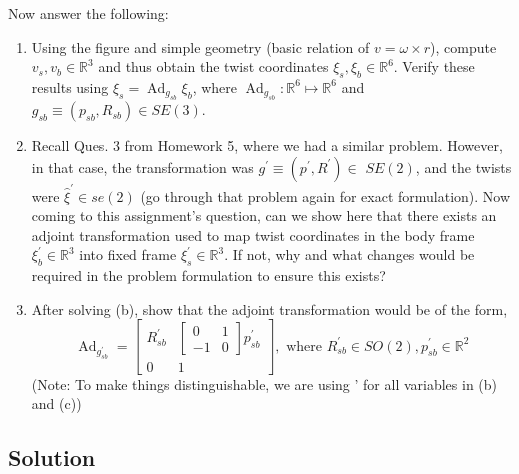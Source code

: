 Now answer the following:
\begin{enumerate}[label= (\alph*)]
    \item Using the figure and simple geometry (basic relation of \( v=\omega \times r \)), compute \( v_{s}, v_{b} \in \mathbb{R}^{3} \) and thus obtain the twist coordinates \( \xi_{s}, \xi_{b} \in \mathbb{R}^{6} \).
          Verify these results using \( \xi_{s}=\operatorname{Ad}_{g_{s b}} \xi_{b} \), where \( \operatorname{Ad}_{g_{s b}}: \mathbb{R}^{6} \mapsto \mathbb{R}^{6} \) and \( g_{s b} \equiv\left(p_{s b}, R_{s b}\right) \in S E(3) \).
    \item Recall Ques. 3 from Homework 5, where we had a similar problem.
          However, in that case, the transformation was \( g^{\prime} \equiv\left(p^{\prime}, R^{\prime}\right) \in \) \( S E(2) \), and the twists were \( \widehat{\xi}^{\prime} \in s e(2) \) (go through that problem again for exact formulation).
          Now coming to this assignment's question, can we show here that there exists an adjoint transformation used to map twist coordinates in the body frame \( \xi_{b}^{\prime} \in \mathbb{R}^{3} \) into fixed frame \( \xi_{s}^{\prime} \in \mathbb{R}^{3} \).
          If not, why and what changes would be required in the problem formulation to ensure this exists?
    \item After solving (b), show that the adjoint transformation would be of the form,
          \[
              \operatorname{Ad}_{g_{s b}^{\prime}}=\left[\begin{array}{cc}
                      R_{s b}^{\prime} & {\left[\begin{array}{cc}
                                                                0  & 1 \\
                                                                -1 & 0
                                                            \end{array}\right] p_{s b}^{\prime}} \\
                      0                & 1
                  \end{array}\right], \text { where } R_{s b}^{\prime} \in S O(2), p_{s b}^{\prime} \in \mathbb{R}^{2}
          \]
          (Note: To make things distinguishable, we are using ' for all variables in (b) and (c))
\end{enumerate}

\clearpage
\subsection*{Solution}

